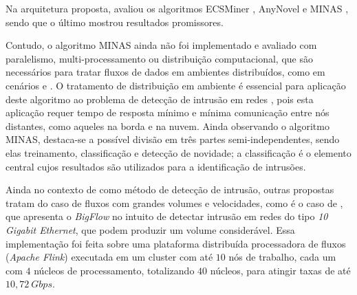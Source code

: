 Na arquitetura proposta,  avaliou os algoritmos
ECSMiner \cite{Masud2010ECSMiner}, AnyNovel \cite{Abdallah2016anynovel} e MINAS
\cite{Faria2016minas}, sendo que o último mostrou resultados promissores.

Contudo, o algoritmo MINAS ainda não foi implementado e avaliado com paralelismo,
multi-processamento ou distribuição computacional, que são necessários para
tratar fluxos de dados 
em ambientes distribuídos, como em cenários \iot e \fog.
O tratamento de distribuição em ambiente \fog é essencial para aplicação deste
algoritmo ao problema de detecção de intrusão em redes \iot, pois esta aplicação
requer tempo de resposta mínimo e mínima comunicação entre nós distantes, como
aqueles na borda e na nuvem.
Ainda observando o algoritmo MINAS, destaca-se a possível divisão em três partes
semi-independentes, sendo elas treinamento, classificação e detecção de
novidade; a classificação é o elemento central cujos resultados são utilizados
para a identificação de intrusões.

Ainda no contexto de \nd como método de detecção de intrusão, outras propostas
tratam do caso de fluxos com grandes volumes e velocidades, como é o caso de
, que apresenta o \emph{BigFlow} no intuito de detectar
intrusão em redes do tipo \emph{10 Gigabit Ethernet}, que podem produzir um
volume considerável.
Essa implementação foi feita sobre uma plataforma distribuída processadora de
fluxos (\emph{Apache Flink}) executada em um cluster com até $10$ nós de trabalho,
cada um com $4$ núcleos de processamento, totalizando $40$ núcleos, para atingir
taxas de até $10,72 \ Gbps$.

